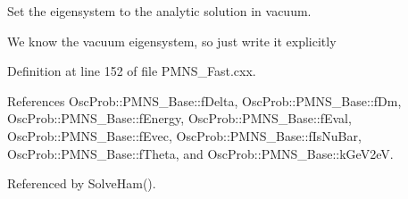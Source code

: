 Set the eigensystem to the analytic solution in vacuum.

We know the vacuum eigensystem, so just write it explicitly 

Definition at line 152 of file P\+M\+N\+S\+\_\+\+Fast.\+cxx.



References Osc\+Prob\+::\+P\+M\+N\+S\+\_\+\+Base\+::f\+Delta, Osc\+Prob\+::\+P\+M\+N\+S\+\_\+\+Base\+::f\+Dm, Osc\+Prob\+::\+P\+M\+N\+S\+\_\+\+Base\+::f\+Energy, Osc\+Prob\+::\+P\+M\+N\+S\+\_\+\+Base\+::f\+Eval, Osc\+Prob\+::\+P\+M\+N\+S\+\_\+\+Base\+::f\+Evec, Osc\+Prob\+::\+P\+M\+N\+S\+\_\+\+Base\+::f\+Is\+Nu\+Bar, Osc\+Prob\+::\+P\+M\+N\+S\+\_\+\+Base\+::f\+Theta, and Osc\+Prob\+::\+P\+M\+N\+S\+\_\+\+Base\+::k\+Ge\+V2eV.



Referenced by Solve\+Ham().


